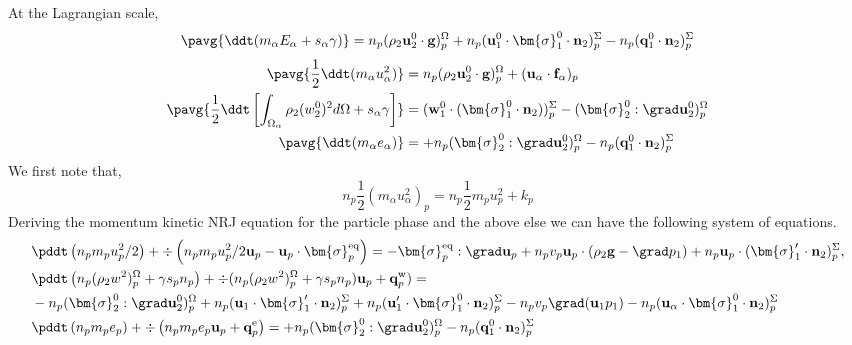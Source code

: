 At the Lagrangian scale, 
\begin{equation*}
    \pavg{\ddt (m_\alpha E_\alpha + s_\alpha \gamma)}
    = 
     n_p (\rho_2 \textbf{u}_2^0  \cdot \textbf{g})^\Omega_p
    +n_p (\textbf{u}_1^0 \cdot \bm{\sigma}_1^0 \cdot  \textbf{n}_2)^\Sigma_p
    - n_p (\textbf{q}_1^0 \cdot \textbf{n}_2)^\Sigma_p
\end{equation*}
\begin{align}
    \pavg{\frac{1}{2}\ddt (m_\alpha u_\alpha^2)}
    &= 
    n_p (\rho_2 \textbf{u}_2^0 \cdot
    \textbf{g})_p^\Omega
    + 
    (\textbf{u}_\alpha\cdot
    \textbf{f}_\alpha)_p\\
    \pavg{\frac{1}{2}\ddt \left[\int_{\Omega_\alpha} \rho_2 (w_2^0)^2 d\Omega +s_\alpha \gamma\right] }
    &= (\textbf{w}_1^0 \cdot (\bm{\sigma}_1^0 \cdot \textbf{n}_2) )_p^\Sigma  
     - (\bm{\sigma}_2^0 : \grad\textbf{u}_2^0)_p^\Omega  
    \\
    \pavg{\ddt (m_\alpha e_\alpha )}
    &= 
     + n_p (\bm{\sigma}_2^0 : \grad\textbf{u}_2^0)^\Omega_p
    -  n_p (\textbf{q}_1^0 \cdot \textbf{n}_2 )_p^\Sigma
\end{align}
We first note that, 
\begin{equation*}
    n_p\frac{1}{2}(m_\alpha u_\alpha^2)_p
    = n_p\frac{1}{2}m_p u_p^2
    +  k_p
\end{equation*}
Deriving the momentum kinetic NRJ equation for the particle phase and the above else we can have the following system of equations. 
\begin{align*}
    &\pddt \left(n_p m_p u_p^2/ 2\right)
    + \div \left(n_p
    m_p u_p^2/ 2 \textbf{u}_p 
    - \textbf{u}_p \cdot \bm{\sigma}_p^\text{eq}
    \right)
    = 
    - \bm{\sigma}_p^\text{eq}  :\grad \textbf{u}_p
    +  n_p v_p \textbf{u}_p \cdot (
    \rho_2 \textbf{g}
    - \grad p_1 )
    + n_p \textbf{u}_p \cdot (\bm{\sigma}'_1 \cdot \textbf{n}_2)^\Sigma_p,\\
    &\pddt \left(n_p (\rho_2 w^2 )_p^\Omega+\gamma s_p n_p\right)
    + \div 
    (n_p (\rho_2 w^2 )_p^\Omega+\gamma s_p n_p)
    \textbf{u}_p 
    +  \textbf{q}_p^\text{w}
    )
    = \\
    &- n_p (\bm{\sigma}_2^0 : \grad\textbf{u}_2^0)^\Omega_p
    + n_p (\textbf{u}_1 \cdot \bm{\sigma}_1' \cdot  \textbf{n}_2)^\Sigma_p
    + n_p (\textbf{u}_1' \cdot \bm{\sigma}_1^0 \cdot  \textbf{n}_2)^\Sigma_p
    -n_p v_p \grad (\textbf{u}_1p_1)
    - n_p (\textbf{u}_\alpha \cdot \bm{\sigma}_1^0 \cdot  \textbf{n}_2)^\Sigma_p
    \\
    &\pddt \left(n_p m_p e_p\right)
    + \div \left(n_p
    m_p e_p \textbf{u}_p 
    +  \textbf{q}_p^\text{e}
    \right)
    = 
    + n_p (\bm{\sigma}_2^0 : \grad\textbf{u}_2^0)^\Omega_p
    - n_p (\textbf{q}_1^0\cdot \textbf{n}_2)^\Sigma_p\\
\end{align*}

